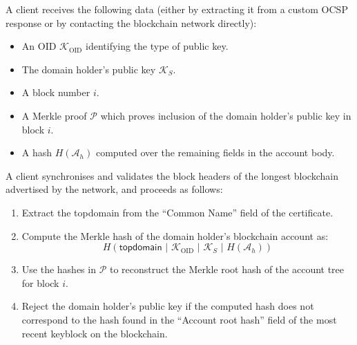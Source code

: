 \documentclass{style/kththesis}
\begin{document}
\begin{appendices}
A client receives the following data (either by extracting it from a custom OCSP response or by contacting the blockchain network directly):

\begin{itemize}
    \item[\checkmark] An OID $\mathcal{K}_{\text{OID}}$ identifying the type of public key.
    \item[\checkmark] The domain holder's public key $\mathcal{K}_{S}$.
    \item[\checkmark] A block number $i$.
    \item[\checkmark] A Merkle proof $\mathcal{P}$ which proves inclusion of the domain holder's public key in block $i$.
    \item[\checkmark] A hash $H(\mathcal{A}_h)$ computed over the remaining fields in the account body.
\end{itemize}

A client synchronises and validates the block headers of the longest blockchain advertised by the network, and proceeds as follows:

\begin{enumerate}
    \item Extract the topdomain from the ``Common Name'' field of the certificate.
    \item Compute the Merkle hash of the domain holder's blockchain account as:
    \[
        H(\mathsf{topdomain} \text{ | } \mathcal{K}_{\text{OID}} \text{ | } \mathcal{K}_S \text{ | } H(\mathcal{A}_h))
    \]
    \item Use the hashes in $\mathcal{P}$ to reconstruct the Merkle root hash of the account tree for block $i$.
    \item Reject the domain holder's public key if the computed hash does not correspond to the hash found in the ``Account root hash'' field of the most recent keyblock on the blockchain.
\end{enumerate}

\end{appendices}

\ifbook
\clearpage %

\fi
\end{document}
